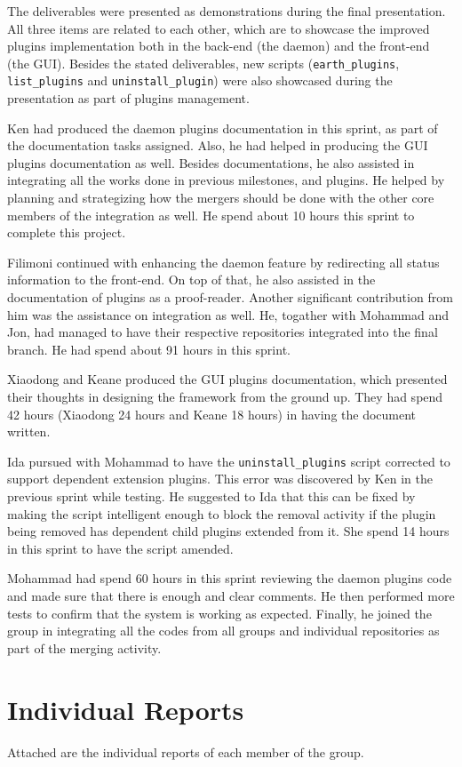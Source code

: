 \documentclass{article}
\begin{document}
The deliverables were presented as demonstrations during the final presentation. All three items are related to each other, which are to showcase the improved plugins implementation both in the back-end (the daemon) and the front-end (the GUI). Besides the stated deliverables, new scripts (\texttt{earth\_plugins}, \texttt{list\_plugins} and \texttt{uninstall\_plugin}) were also showcased during the presentation as part of plugins management.

Ken had produced the daemon plugins documentation in this sprint, as part of the documentation tasks assigned. Also, he had helped in producing the GUI plugins documentation as well. Besides documentations, he also assisted in integrating all the works done in previous milestones, and plugins. He helped by planning and strategizing how the mergers should be done with the other core members of the integration as well. He spend about 10 hours this sprint to complete this project. 

Filimoni continued with enhancing the daemon feature by redirecting all status information to the front-end. On top of that, he also assisted in the documentation of plugins as a proof-reader. Another significant contribution from him was the assistance on integration as well. He, togather with Mohammad and Jon, had managed to have their respective repositories integrated into the final branch. He had spend about 91 hours in this sprint. 

Xiaodong and Keane produced the GUI plugins documentation, which presented their thoughts in designing the framework from the ground up. They had spend 42 hours (Xiaodong 24 hours and Keane 18 hours) in having the document written.

Ida pursued with Mohammad to have the \texttt{uninstall\_plugins} script corrected to support dependent extension plugins. This error was discovered by Ken in the previous sprint while testing. He suggested to Ida that this can be fixed by making the script intelligent enough to block the removal activity if the plugin being removed has dependent child plugins extended from it. She spend 14 hours in this sprint to have the script amended. 

Mohammad had spend 60 hours in this sprint reviewing the daemon plugins code and made sure that there is enough and clear comments. He then performed more tests to confirm that the system is working as expected. Finally, he joined the group in integrating all the codes from all groups and individual repositories as part of the merging activity. 
 
\section*{Individual Reports}

Attached are the individual reports of each member of the group. 














\end{document}
